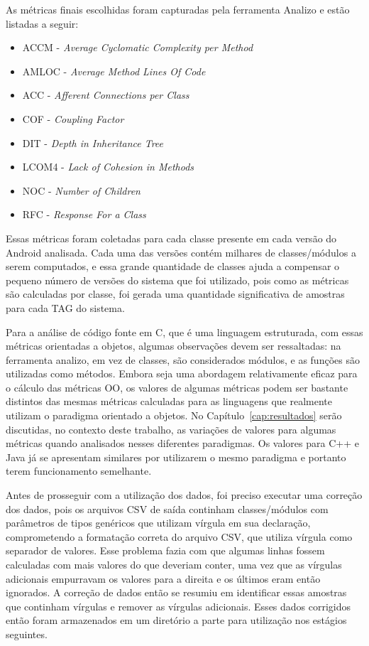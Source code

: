 As métricas finais escolhidas foram capturadas pela ferramenta Analizo e estão listadas a seguir:

\begin{itemize}
\item ACCM - \textit{Average Cyclomatic Complexity per Method}
\item AMLOC - \textit{Average Method Lines Of Code}
\item ACC - \textit{Afferent Connections per Class}
\item COF - \textit{Coupling Factor}
\item DIT - \textit{Depth in Inheritance Tree}
\item LCOM4 - \textit{Lack of Cohesion in Methods}
\item NOC - \textit{Number of Children}
\item RFC - \textit{Response For a Class}
\end{itemize}


Essas métricas foram coletadas para cada classe presente em cada versão do Android analisada. Cada uma das versões contém milhares de classes/módulos a serem computados, e essa grande quantidade de classes ajuda a compensar o pequeno número de versões do sistema que foi utilizado, pois como as métricas são calculadas por classe, foi gerada uma quantidade significativa de amostras para cada TAG do sistema.

Para a análise de código fonte em C, que é uma linguagem estruturada, com essas métricas orientadas a objetos, algumas observações devem ser ressaltadas: na ferramenta analizo, em vez de classes, são considerados módulos, e as funções são utilizadas como métodos\cite{meirelles2013}. Embora seja uma abordagem relativamente eficaz para o cálculo das métricas OO, os valores de algumas métricas podem ser bastante distintos das mesmas métricas calculadas para as linguagens que realmente utilizam o paradigma orientado a objetos. No Capítulo~\ref{cap:resultados} serão discutidas, no contexto deste trabalho, as variações de valores para algumas métricas quando analisados nesses diferentes paradigmas. Os valores para C++ e Java já se apresentam similares por utilizarem o mesmo paradigma e portanto terem funcionamento semelhante.

Antes de prosseguir com a utilização dos dados, foi preciso executar uma correção dos dados, pois os arquivos CSV de saída continham classes/módulos com parâmetros de tipos genéricos que utilizam vírgula em sua declaração, comprometendo a formatação correta do arquivo CSV, que utiliza vírgula como separador de valores. Esse problema fazia com que algumas linhas fossem calculadas com mais valores do que deveriam conter, uma vez que as vírgulas adicionais empurravam os valores para a direita e os últimos eram então ignorados. A correção de dados então se resumiu em identificar essas amostras que continham vírgulas e remover as vírgulas adicionais. Esses dados corrigidos então foram armazenados em um diretório a parte para utilização nos estágios seguintes.

